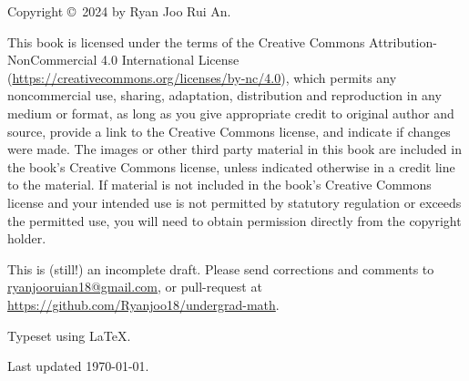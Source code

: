 \vfill

Copyright \copyright \ 2024 by Ryan Joo Rui An.

This book is licensed under the terms of the Creative Commons Attribution-NonCommercial 4.0 International License (\url{https://creativecommons.org/licenses/by-nc/4.0}), which permits any noncommercial use, sharing, adaptation, distribution and reproduction in any medium or format, as long as you give appropriate credit to original author and source, provide a link to the Creative Commons license, and indicate if changes were made. The images or other third party material in this book are included in the book's Creative Commons license, unless indicated otherwise in a credit line to the material. If material is not included in the book's Creative Commons license and your intended use is not permitted by statutory regulation or exceeds the permitted use, you will need to obtain permission directly from the copyright holder.

This is (still!) an incomplete draft. Please send corrections and comments to \url{ryanjooruian18@gmail.com}, or pull-request at \url{https://github.com/Ryanjoo18/undergrad-math}.

Typeset using \LaTeX.

Last updated \today.
\pagebreak

